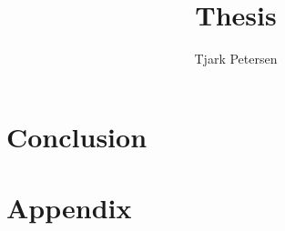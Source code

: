 \documentclass[11pt,a4paper]{report}
\author{Tjark Petersen}
\title{Thesis}
\begin{document}
\maketitle



\chapter{Conclusion} %

\printbibliography


\chapter{Appendix} %
\end{document}

